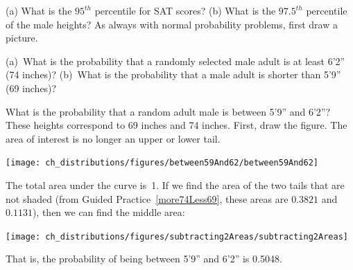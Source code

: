 \begin{exercisewrap}
\begin{nexercise}
(a) What is the $95^{th}$ percentile for SAT scores? (b) What is the $97.5^{th}$ percentile of the male heights? As always with normal probability problems, first draw a picture.\footnotemark
\end{nexercise}
\end{exercisewrap}

\begin{exercisewrap}
\begin{nexercise}\label{more74Less69}
(a)~What is the probability that a randomly selected male adult is at least 6'2'' (74 inches)? (b)~What is the probability that a male adult is shorter than 5'9'' (69 inches)?\footnotemark
\end{nexercise}
\end{exercisewrap}
\addtocounter{footnote}{-1}

\begin{examplewrap}
\begin{nexample}{What is the probability that a random adult male is between 5'9'' and 6'2''?}
These heights correspond to 69 inches and 74 inches. First, draw the figure. The area of interest is no longer an upper or lower tail.%
\begin{center}
\texttt{[image: ch\_distributions/figures/between59And62/between59And62]}%
\end{center}
The total area under the curve is~1. If we find the area of the two tails that are not shaded (from Guided Practice~\ref{more74Less69}, these areas are $0.3821$ and $0.1131$), then we can find the middle area:%
\begin{center}
\texttt{[image: ch\_distributions/figures/subtracting2Areas/subtracting2Areas]}%
\end{center}
That is, the probability of being between 5'9'' and 6'2'' is 0.5048.
\end{nexample}
\end{examplewrap}

